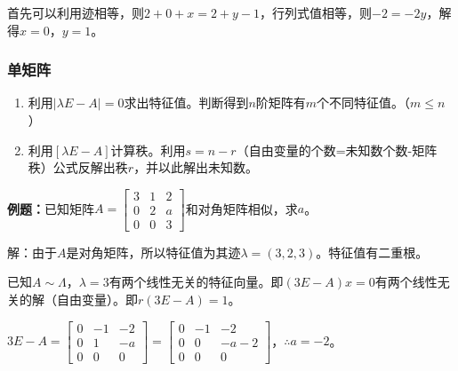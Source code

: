 \documentclass[UTF8, 12pt]{ctexart}
\begin{document}
首先可以利用迹相等，则$2+0+x=2+y-1$，行列式值相等，则$-2=-2y$，解得$x=0$，$y=1$。

\subsubsection{单矩阵}



\begin{enumerate}
    \item 利用$\vert\lambda E-A\vert=0$求出特征值。判断得到$n$阶矩阵有$m$个不同特征值。（$m\leqslant n$）
    \item 利用$[\lambda E-A]$计算秩。利用$s=n-r$（自由变量的个数=未知数个数-矩阵秩）公式反解出秩$r$，并以此解出未知数。
\end{enumerate}

\textbf{例题：}已知矩阵$A=\left[\begin{array}{ccc}
    3 & 1 & 2 \\
    0 & 2 & a \\
    0 & 0 & 3
\end{array}\right]$和对角矩阵相似，求$a$。\medskip

解：由于$A$是对角矩阵，所以特征值为其迹$\lambda=(3,2,3)$。特征值有二重根。

已知$A\sim\Lambda$，$\lambda=3$有两个线性无关的特征向量。即$(3E-A)x=0$有两个线性无关的解（自由变量）。即$r(3E-A)=1$。

$3E-A=\left[\begin{array}{ccc}
    0 & -1 & -2 \\
    0 & 1 & -a \\
    0 & 0 & 0
\end{array}\right]=\left[\begin{array}{ccc}
    0 & -1 & -2 \\
    0 & 0 & -a-2 \\
    0 & 0 & 0
\end{array}\right]$，$\therefore a=-2$。
\end{document}
